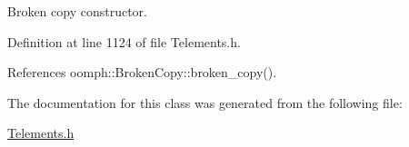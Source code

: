 Broken copy constructor. 



Definition at line 1124 of file Telements.\+h.



References oomph\+::\+Broken\+Copy\+::broken\+\_\+copy().



The documentation for this class was generated from the following file\+:\begin{DoxyCompactItemize}
\item 
\hyperlink{Telements_8h}{Telements.\+h}\end{DoxyCompactItemize}
